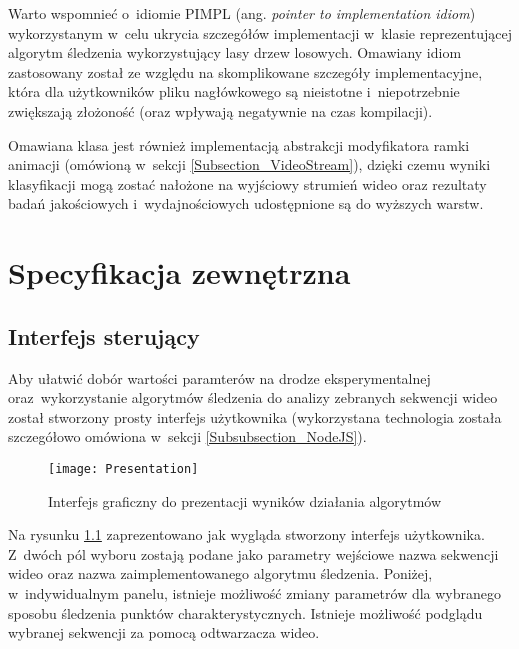       Warto wspomnieć o~idiomie PIMPL (ang. \textit{pointer to implementation idiom}) wykorzystanym w~celu ukrycia szczegółów implementacji w~klasie reprezentującej algorytm śledzenia wykorzystujący lasy drzew losowych. Omawiany idiom zastosowany został ze względu na skomplikowane szczegóły implementacyjne, która dla użytkowników pliku nagłówkowego są nieistotne i~niepotrzebnie zwiększają złożoność (oraz wpływają negatywnie na czas kompilacji).

      Omawiana klasa jest również implementacją abstrakcji modyfikatora ramki animacji (omówioną w~sekcji \ref{Subsection_VideoStream}), dzięki czemu wyniki klasyfikacji mogą zostać nałożone na wyjściowy strumień wideo oraz rezultaty badań jakościowych i~wydajnościowych udostępnione są do wyższych warstw.

\chapter{Specyfikacja zewnętrzna}\label{Chapter_SpecyfikacjaZewnetrzna}

  \section{Interfejs sterujący}\label{Section_Front}

    Aby ułatwić dobór wartości paramterów na drodze eksperymentalnej oraz~wykorzystanie algorytmów śledzenia do analizy zebranych sekwencji wideo został stworzony prosty interfejs użytkownika (wykorzystana technologia została szczegółowo omówiona w~sekcji \ref{Subsubsection_NodeJS}).

      \begin{figure}[!ht]
        \centering
        \texttt{[image: Presentation]}
        \caption[Interfejs graficzny do prezentacji wyników działania algorytmów]{Interfejs graficzny do prezentacji wyników działania algorytmów}
        \label{fig:AlgorithmsPresentation}
      \end{figure}

    Na rysunku \ref{fig:AlgorithmsPresentation} zaprezentowano jak wygląda stworzony interfejs użytkownika. Z~dwóch pól wyboru zostają podane jako parametry wejściowe nazwa sekwencji wideo oraz nazwa zaimplementowanego algorytmu śledzenia. Poniżej, w~indywidualnym panelu, istnieje możliwość zmiany parametrów dla wybranego sposobu śledzenia punktów charakterystycznych. Istnieje możliwość podglądu wybranej sekwencji za pomocą odtwarzacza wideo.

